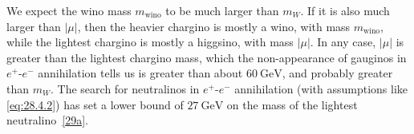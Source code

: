 We expect the wino mass \(m_{\mathrm{wino}}\) to be much larger than
\(m_W\). If it is also much larger than \(|\mu|\), then the heavier
chargino is mostly a wino, with mass \(m_{\mathrm{wino}}\), while the
lightest chargino is mostly a higgsino, with mass \(|\mu|\). In any case,
\(|\mu|\) is greater than the lightest chargino mass, which the
non-appearance of gauginos in \(e^+\)-\(e^-\) annihilation tells us is
greater than about \(60\ \mathrm{GeV}\), and probably greater than \(m_W\).
The search for neutralinos in \(e^+\)-\(e^-\) annihilation (with
assumptions like \eqref{eq:28.4.2}) has set a lower bound of
\(27\ \mathrm{GeV}\) on the mass of the lightest
neutralino~\hyperref[ch28-ref-29a]{[29a]}.
